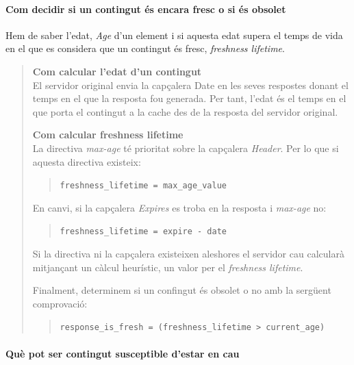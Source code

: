 \documentclass[a4paper, 11pt]{article}
\begin{document}
\paragraph{Com decidir si un contingut \'es encara fresc o si \'es obsolet \\}

Hem de saber l'edat, \textit{Age} d'un element i si aquesta edat supera el temps de vida en el que es considera que un contingut \'es fresc, \textit{freshness lifetime}.

\begin{quote}
	
\textbf{Com calcular l'edat d'un contingut}\\ El servidor original envia la capçalera Date en les seves respostes donant el temps en el que la resposta fou generada. Per tant, l'edat \'es el temps en el que porta el contingut a la cache des de la resposta del servidor original.

\textbf{Com calcular freshness lifetime}\\ La directiva \textit{max-age} t\'e prioritat sobre la capçalera \textit{Header}. Per lo que si aquesta directiva existeix:
\begin{quote}
	\verb+freshness_lifetime = max_age_value+
\end{quote}

En canvi, si la capçalera \textit{Expires} es troba en la resposta i \textit{max-age} no:
\begin{quote}
	\verb+freshness_lifetime = expire - date+
\end{quote}

Si la directiva ni la capçalera existeixen aleshores el servidor cau calcularà mitjançant un càlcul heurístic, un valor per el \textit{freshness lifetime}.

Finalment, determinem si un confingut \'es obsolet o no amb la sergüent comprovació:
\begin{quote}
	\verb+response_is_fresh = (freshness_lifetime > current_age)+
\end{quote}

\end{quote}
\paragraph{Què pot ser contingut susceptible d'estar en cau \\}
\end{document}
